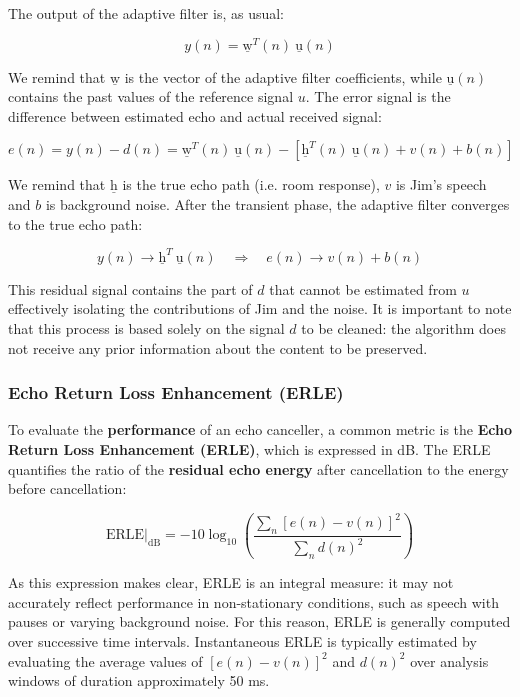 The output of the adaptive filter is, as usual:

\[
y(n) = \underline{\mathrm{w}}^T(n) \ \underline{\mathrm{u}}(n)
\]

We remind that $\underline{\mathrm{w}}$ is the vector of the adaptive filter coefficients, while $\underline{\mathrm{u}}(n)$ contains the past values of the reference signal $u$.
The error signal is the difference between estimated echo and actual received signal:

\[
e(n) = y(n) - d(n) = \underline{\mathrm{w}}^T(n) \ \underline{\mathrm{u}}(n) - \left[ \underline{\mathrm{h}}^T(n) \ \underline{\mathrm{u}}(n) + v(n) + b(n) \right]
\]

We remind that $\underline{\mathrm{h}}$ is the true echo path (i.e. room response), $v$ is Jim's speech and $b$ is background noise.
After the transient phase, the adaptive filter converges to the true echo path:

\[
y(n) \longrightarrow \underline{\mathrm{h}}^T \ \underline{\mathrm{u}}(n) \quad \Rightarrow \quad
e(n) \longrightarrow v(n) + b(n)
\]

This residual signal contains the part of $d$ that cannot be estimated from $u$ effectively isolating the contributions of Jim and the noise.
It is important to note that this process is based solely on the signal $d$ to be cleaned: the algorithm does not receive any prior information about the content to be preserved.

\subsubsection{Echo Return Loss Enhancement (ERLE)}

To evaluate the \textbf{performance} of an echo canceller, a common metric is the \textbf{Echo Return Loss Enhancement (ERLE)}, which is expressed in dB.
The ERLE quantifies the ratio of the \textbf{residual echo energy} after cancellation to the energy before cancellation:

\[
\left. \mathrm{ERLE} \right|_{\mathrm{dB}} = -10 \log_{10} \left( \frac{\sum_n \left[e(n) - v(n)\right]^2}{\sum_n d(n)^2} \right)
\]

As this expression makes clear, ERLE is an integral measure: it may not accurately reflect performance in non-stationary conditions, such as speech with pauses or varying background noise.
For this reason, ERLE is generally computed over successive time intervals.
Instantaneous ERLE is typically estimated by evaluating the average values of $[e(n) - v(n)]^2$ and $d(n)^2$ over analysis windows of duration approximately 50 ms.

